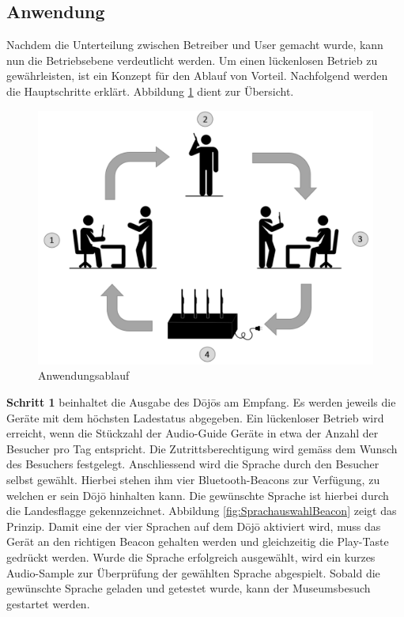 \subsection{Anwendung}\label{sec:ladeablauf}
Nachdem die Unterteilung zwischen Betreiber und User gemacht wurde, kann nun die Betriebsebene verdeutlicht werden. Um einen lückenlosen Betrieb zu gewährleisten, ist ein Konzept für den Ablauf von Vorteil. Nachfolgend werden die Hauptschritte erklärt. Abbildung \ref{fig:Anwendungsablauf Dojo} dient zur Übersicht.

\begin{figure}[H]
	\begin{center}
		\includegraphics[width=120mm]{data/Ladezyklus.png}
		\caption[Anwendungsablauf des Dōjōs]{Anwendungsablauf} %
		\label{fig:Anwendungsablauf Dojo}
	\end{center}
\end{figure}

\textbf{Schritt 1} beinhaltet die Ausgabe des Dōjōs am Empfang. Es werden jeweils die Geräte mit dem höchsten Ladestatus abgegeben. Ein lückenloser Betrieb wird erreicht, wenn die Stückzahl der Audio-Guide Geräte in etwa der Anzahl der Besucher pro Tag entspricht. Die Zutrittsberechtigung wird gemäss dem Wunsch des Besuchers festgelegt. Anschliessend wird die Sprache durch den Besucher selbst gewählt. Hierbei stehen ihm vier Bluetooth-Beacons zur Verfügung, zu welchen er sein Dōjō hinhalten kann. Die gewünschte Sprache ist hierbei durch die Landesflagge gekennzeichnet. Abbildung \ref{fig:SprachauswahlBeacon} zeigt das Prinzip. Damit eine der vier Sprachen auf dem Dōjō aktiviert wird, muss das Gerät an den richtigen Beacon gehalten werden und gleichzeitig die Play-Taste gedrückt werden. Wurde die Sprache erfolgreich ausgewählt, wird ein kurzes Audio-Sample zur Überprüfung der gewählten Sprache abgespielt. Sobald die gewünschte Sprache geladen und getestet wurde, kann der Museumsbesuch gestartet werden.

